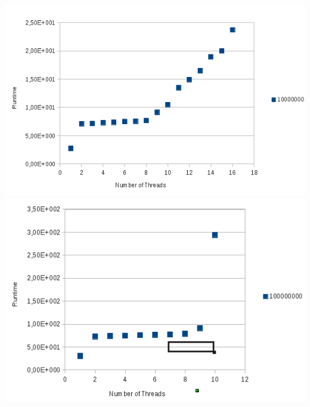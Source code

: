 \documentclass[a4paper,10pt]{article}
\begin{document}
\begin{center}
\includegraphics{strong_scaling_10000000.png}\\
\includegraphics{strong_scaling_100000000.png}\\\end{center}
\end{document}
